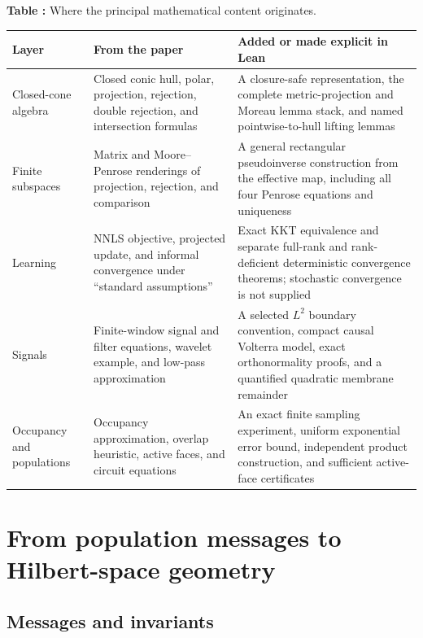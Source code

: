 \documentclass[11pt,a4paper]{article}
\begin{document}
\begin{center}
\small
{}
\label{tab:provenance-map}
\textbf{Table \thetable:} Where the principal mathematical content originates.\par
\vspace{0.5em}
\begin{tabularx}{\linewidth}{@{}L{31mm}Y Y@{}}
\toprule
\textbf{Layer} & \textbf{From the paper} & \textbf{Added or made explicit in Lean} \\
\midrule
Closed-cone algebra & Closed conic hull, polar, projection, rejection,
double rejection, and intersection formulas & A closure-safe representation,
the complete metric-projection and Moreau lemma stack, and named pointwise-to-hull
lifting lemmas \\
Finite subspaces & Matrix and Moore--Penrose renderings of projection,
rejection, and comparison & A general rectangular pseudoinverse construction
from the effective map, including all four Penrose equations and uniqueness \\
Learning & NNLS objective, projected update, and informal convergence under
``standard assumptions'' & Exact KKT equivalence and separate full-rank and
rank-deficient deterministic convergence theorems; stochastic convergence is
not supplied \\
Signals & Finite-window signal and filter equations, wavelet example, and
low-pass approximation & A selected \(L^2\) boundary convention, compact causal
Volterra model, exact orthonormality proofs, and a quantified quadratic membrane
remainder \\
Occupancy and populations & Occupancy approximation, overlap heuristic, active
faces, and circuit equations & An exact finite sampling experiment, uniform
exponential error bound, independent product construction, and sufficient
active-face certificates \\
\bottomrule
\end{tabularx}
\end{center}

\section{From population messages to Hilbert-space geometry}
\label{sec:model}

\subsection{Messages and invariants}
\end{document}
